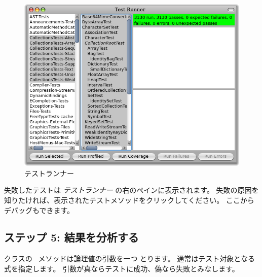 \documentclass[a4paper,10pt,twoside]{book}
\begin{document}

\begin{figure}[tbh]
  \begin{center}
	\includegraphics[width=\linewidth]{test-runner}
	\caption{\pharo \sunit テストランナー}
  \end{center}
\end{figure}



失敗したテストは \emph{テストランナー} の右のペインに表示されます。
失敗の原因を知りたければ、表示されたテストメソッドをクリックしてください。
ここからデバッグもできます。

\subsection{ステップ 5: 結果を分析する}

 クラスの \ メソッドは論理値の引数を一つ
とります。
通常はテスト対象となる式を指定します。
引数が真ならテストに成功、偽なら失敗とみなします。

\end{document}
